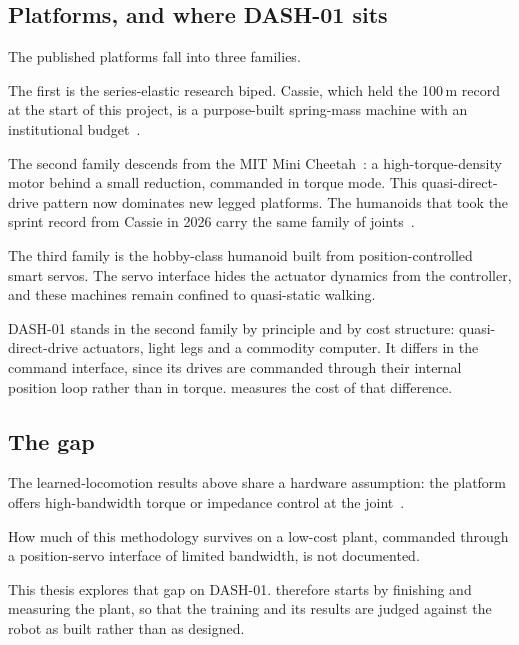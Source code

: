 \subsection{Platforms, and where DASH-01 sits}
\label{sec:bg-platforms}

The published platforms fall into three families.

The first is the series-elastic research biped. Cassie, which held the 100\,m record at the start of this project, is a purpose-built spring-mass machine with an institutional budget~\cite{crowley2024cassie,xie2019}.

The second family descends from the MIT Mini Cheetah~\cite{katz2019minicheetah}: a high-torque-density motor behind a small reduction, commanded in torque mode. This quasi-direct-drive pattern now dominates new legged platforms. The humanoids that took the sprint record from Cassie in 2026 carry the same family of joints~\cite{apnews2026chinese}.

The third family is the hobby-class humanoid built from position-controlled smart servos. The servo interface hides the actuator dynamics from the controller, and these machines remain confined to quasi-static walking.

DASH-01 stands in the second family by principle and by cost structure: quasi-direct-drive actuators, light legs and a commodity computer. It differs in the command interface, since its drives are commanded through their internal position loop rather than in torque.  measures the cost of that difference.

\subsection{The gap}
\label{sec:bg-gap}

The learned-locomotion results above share a hardware assumption: the platform offers high-bandwidth torque or impedance control at the joint~\cite{hwangbo2019anymal,katz2019minicheetah,xie2019}.

How much of this methodology survives on a low-cost plant, commanded through a position-servo interface of limited bandwidth, is not documented.

This thesis explores that gap on DASH-01.  therefore starts by finishing and measuring the plant, so that the training and its results are judged against the robot as built rather than as designed.
